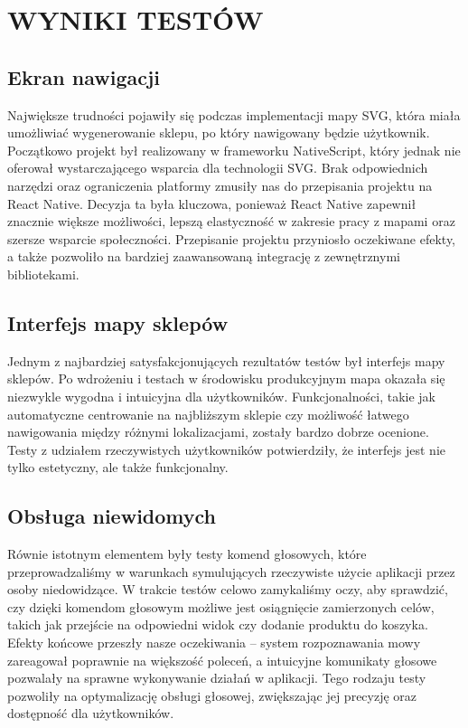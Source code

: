 \chapter{WYNIKI TESTÓW}
\label{chapter:wyniki_testow}

\section{Ekran nawigacji} 
Największe trudności pojawiły się podczas implementacji mapy SVG, która miała umożliwiać wygenerowanie sklepu, po który nawigowany będzie użytkownik. Początkowo projekt był realizowany w frameworku NativeScript, który jednak nie oferował wystarczającego wsparcia dla technologii SVG. Brak odpowiednich narzędzi oraz ograniczenia platformy zmusiły nas do przepisania projektu na React Native. Decyzja ta była kluczowa, ponieważ React Native zapewnił znacznie większe możliwości, lepszą elastyczność w zakresie pracy z mapami oraz szersze wsparcie społeczności. Przepisanie projektu przyniosło oczekiwane efekty, a także pozwoliło na bardziej zaawansowaną integrację z zewnętrznymi bibliotekami.

\section{Interfejs mapy sklepów} 
Jednym z najbardziej satysfakcjonujących rezultatów testów był interfejs mapy sklepów. Po wdrożeniu i testach w środowisku produkcyjnym mapa okazała się niezwykle wygodna i intuicyjna dla użytkowników. Funkcjonalności, takie jak automatyczne centrowanie na najbliższym sklepie czy możliwość łatwego nawigowania między różnymi lokalizacjami, zostały bardzo dobrze ocenione. Testy z udziałem rzeczywistych użytkowników potwierdziły, że interfejs jest nie tylko estetyczny, ale także funkcjonalny.

\section{Obsługa niewidomych} 
Równie istotnym elementem były testy komend głosowych, które przeprowadzaliśmy w warunkach symulujących rzeczywiste użycie aplikacji przez osoby niedowidzące. W trakcie testów celowo zamykaliśmy oczy, aby sprawdzić, czy dzięki komendom głosowym możliwe jest osiągnięcie zamierzonych celów, takich jak przejście na odpowiedni widok czy dodanie produktu do koszyka. Efekty końcowe przeszły nasze oczekiwania – system rozpoznawania mowy zareagował poprawnie na większość poleceń, a intuicyjne komunikaty głosowe pozwalały na sprawne wykonywanie działań w aplikacji. Tego rodzaju testy pozwoliły na optymalizację obsługi głosowej, zwiększając jej precyzję oraz dostępność dla użytkowników.


